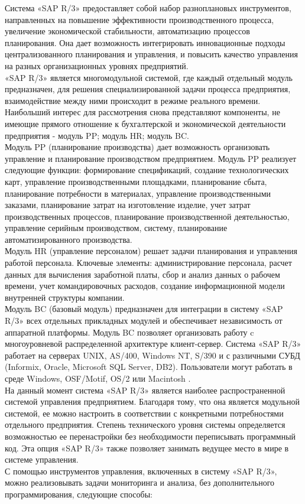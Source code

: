 \indent Система «SAP R/3» предоставляет собой набор разноплановых инструментов, направленных на повышение эффективности производственного процесса, увеличение экономической стабильности, автоматизацию процессов планирования.
Она дает возможность интегрировать инновационные подходы централизованного планирования и управления, и повысить качество управления на разных организационных уровнях предприятий.\\
\indent «SAP R/3» является многомодульной системой, где каждый отдельный модуль предназначен, для решения специализированной задачи процесса предприятия, взаимодействие между ними происходит в режиме реального времени. 
Наибольший интерес для рассмотрения снова представляют компоненты, не имеющие прямого отношение к бухгалтерской и экономической деятельности предприятия - модуль PP; модуль HR; модуль BC.\\
\indent Модуль PP (планирование производства) дает возможность организовать управление и планирование производством предприятием.
Модуль PP реализует следующие функции: формирование спецификаций, создание технологических карт, управление производственными площадками, планирование сбыта, планирование потребности в материалах, управление производственными заказами, планирование затрат на изготовление изделие, учет затрат производственных процессов, планирование производственной деятельностью, управление серийным производством, систему, планирование автоматизированного производства.\\
\indent Модуль HR (управление персоналом) решает задачи планирования и управления работой персонала. 
Ключевые элементы: администрирование персонала, расчет данных для вычисления заработной платы, сбор и анализ данных о рабочем времени, учет командировочных расходов, создание информационной модели внутренней структуры компании.\\
\indent Модуль BC (базовый модуль) предназначен для интеграции в систему «SAP R/3» всех отдельных прикладных модулей и обеспечивает независимость от аппаратной платформы. 
Модуль BC позволяет организовать работу c многоуровневой распределенной архитектуре клиент-сервер. 
Система «SAP R/3» работает на серверах UNIX, AS/400, Windows NT, S/390 и с различными СУБД (Informix, Oracle, Microsoft SQL Server, DB2). 
Пользователи могут работать в среде Windows, OSF/Motif, OS/2 или Macintosh \cite{mazBook}.\\
\indent На данный момент система «SAP R/3» является наиболее распространенной системой управления предприятием. 
Благодаря тому, что она является модульной системой, ее можно настроить в соответствии с конкретными потребностями отдельного предприятия. 
Степень технического уровня системы определяется возможностью ее перенастройки без необходимости переписывать программный код. 
Эта опция «SAP R/3» также позволяет занимать ведущее место в мире в системе управления.\\
\indent С помощью инструментов управления, включенных в систему «SAP R/3», можно реализовывать задачи мониторинга и анализа, без дополнительного программирования, следующие способы:


